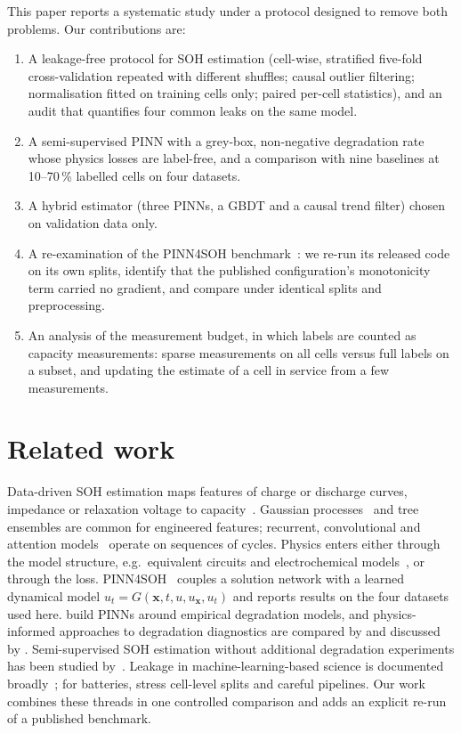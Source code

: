 \documentclass[11pt,a4paper]{article}
\begin{document}
This paper reports a systematic study under a protocol designed to remove both problems. Our contributions are:
\begin{enumerate}
\item A leakage-free protocol for SOH estimation (cell-wise, stratified five-fold cross-validation repeated with
  different shuffles; causal outlier filtering; normalisation fitted on training cells only; paired per-cell
  statistics), and an audit that quantifies four common leaks on the same model.
\item A semi-supervised PINN with a grey-box, non-negative degradation rate whose physics losses are label-free, and a
  comparison with nine baselines at 10--70\,\% labelled cells on four datasets.
\item A hybrid estimator (three PINNs, a GBDT and a causal trend filter) chosen on validation data only.
\item A re-examination of the PINN4SOH benchmark~\citep{wang2024}: we re-run its released code on its own splits,
  identify that the published configuration's monotonicity term carried no gradient, and compare under identical
  splits and preprocessing.
\item An analysis of the measurement budget, in which labels are counted as capacity measurements: sparse measurements
  on all cells versus full labels on a subset, and updating the estimate of a cell in service from a few measurements.
\end{enumerate}

\section{Related work}

Data-driven SOH estimation maps features of charge or discharge curves, impedance or relaxation voltage to
capacity~\citep{severson2019,zhu2022,roman2021}. Gaussian processes~\citep{richardson2017} and tree ensembles are common
for engineered features; recurrent, convolutional and attention models~\citep{zhang2018lstm,hochreiter1997,bai2018tcn,vaswani2017}
operate on sequences of cycles. Physics enters either through the model structure, e.g.\ equivalent circuits and
electrochemical models~\citep{doyle1993,plett2015}, or through the loss. PINN4SOH~\citep{wang2024} couples a solution
network with a learned dynamical model $u_t = G(\mathbf{x}, t, u, u_\mathbf{x}, u_t)$ and reports results on the four
datasets used here. \citet{wen2023} build PINNs around empirical degradation models, and physics-informed approaches
to degradation diagnostics are compared by \citet{navidi2024} and discussed by \citet{aykol2021}.
Semi-supervised SOH estimation without additional degradation experiments has been studied by~\citet{lu2023}. Leakage
in machine-learning-based science is documented broadly~\citep{kapoor2023}; for batteries, \citet{roman2021} stress
cell-level splits and careful pipelines. Our work combines these threads in one controlled comparison and adds an
explicit re-run of a published benchmark.
\end{document}
